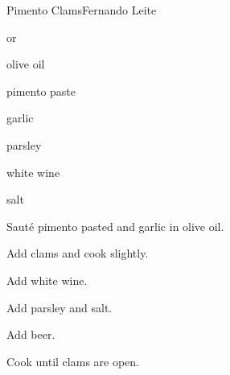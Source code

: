 \begin{recipe}{Pimento Clams}{Fernando Leite}{}

\begin{ingredients}
\item {} or 
\item olive oil
\item pimento paste
\item garlic
\item parsley
\item white wine
\item {}
\item salt
\end{ingredients}

\begin{directions}
\item Sauté pimento pasted and garlic in olive oil.
\item Add clams and cook slightly.
\item Add white wine.
\item Add parsley and salt.
\item Add beer.
\item Cook until clams are open.
\end{directions}

\end{recipe}
